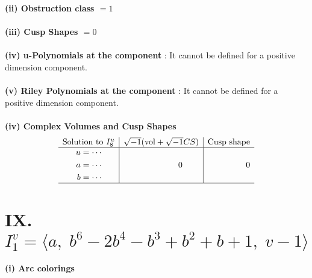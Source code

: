 \documentclass[1p]{elsarticle_modified}
\theoremstyle{definition}
\newcommand{\I}{\sqrt{-1}}
\begin{document}
\flushleft \textbf{(ii) Obstruction class $= 1$}\\~\\
\flushleft \textbf{(iii) Cusp Shapes $= 0$}\\~\\
\flushleft \textbf{(iv) u-Polynomials at the component} : It cannot be defined for a positive dimension component.\\~\\
\flushleft \textbf{(v) Riley Polynomials at the component} : It cannot be defined for a positive dimension component.\\~\\
\newpage\flushleft \textbf{(iv) Complex Volumes and Cusp Shapes}
$$\begin{array}{c|c|c} 
\text{Solution to }I^u_{8}& \I (\text{vol} + \sqrt{-1}CS) & \text{Cusp shape}\\
 \hline 
\begin{aligned}
u &= \cdots \\
a &= \cdots \\
b &= \cdots\end{aligned}
 & \phantom{-0.000000 } 0 & \phantom{-0.000000 } 0\\
 \hline 
 \end{array}
$$\newpage\renewcommand{\arraystretch}{1}
\centering \section*{IX. $I^v_{1}= \langle a,\;b^6-2 b^4- b^3+b^2+b+1,\;v-1 \rangle$}
\flushleft \textbf{(i) Arc colorings}\\
\end{document}
